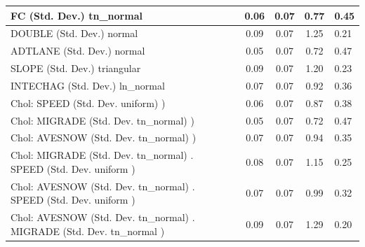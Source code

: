 \begin{table}
\begin{center}
\begin{tabular}{|l|l|c|c|c|l|}
			FC (Std. Dev.) tn_normal &  & 0.06 & 0.07 & 0.77 & 0.45 \\
			\hline
			DOUBLE (Std. Dev.) normal &  & 0.09 & 0.07 & 1.25 & 0.21 \\
			\hline
			ADTLANE (Std. Dev.) normal &  & 0.05 & 0.07 & 0.72 & 0.47 \\
			\hline
			SLOPE (Std. Dev.) triangular &  & 0.09 & 0.07 & 1.20 & 0.23 \\
			\hline
			INTECHAG (Std. Dev.) ln_normal &  & 0.07 & 0.07 & 0.92 & 0.36 \\
			\hline
			 Chol: SPEED (Std. Dev. uniform) ) &  & 0.06 & 0.07 & 0.87 & 0.38 \\
			\hline
			 Chol: MIGRADE (Std. Dev. tn_normal) ) &  & 0.05 & 0.07 & 0.72 & 0.47 \\
			\hline
			 Chol: AVESNOW (Std. Dev. tn_normal) ) &  & 0.07 & 0.07 & 0.94 & 0.35 \\
			\hline
			 Chol: MIGRADE (Std. Dev. tn_normal) . SPEED (Std. Dev.   uniform ) &  & 0.08 & 0.07 & 1.15 & 0.25 \\
			\hline
			 Chol: AVESNOW (Std. Dev. tn_normal) . SPEED (Std. Dev.   uniform ) &  & 0.07 & 0.07 & 0.99 & 0.32 \\
			\hline
			 Chol: AVESNOW (Std. Dev. tn_normal) . MIGRADE (Std. Dev.   tn_normal ) &  & 0.09 & 0.07 & 1.29 & 0.20 \\
			\hline
		\end{tabular}
	\end{center}
\end{table}